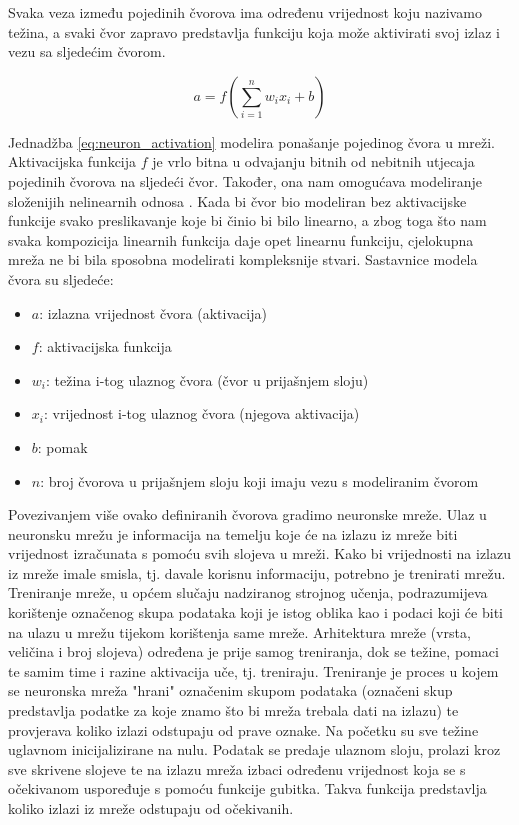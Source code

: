 Svaka veza između pojedinih čvorova ima određenu vrijednost koju nazivamo težina, a svaki čvor
zapravo predstavlja funkciju koja može aktivirati svoj izlaz i vezu sa sljedećim čvorom.

\begin{equation}
  \label{eq:neuron_activation}
  a = f\left(\sum_{i=1}^n w_i x_i + b\right)
\end{equation}

Jednadžba \eqref{eq:neuron_activation} modelira ponašanje pojedinog čvora u mreži. Aktivacijska
funkcija \( f \) je vrlo bitna u odvajanju bitnih od nebitnih utjecaja pojedinih čvorova na sljedeći
čvor. Također, ona nam omogućava modeliranje složenijih nelinearnih odnosa \cite{activation_fcn}.
Kada bi čvor bio modeliran
bez aktivacijske funkcije svako preslikavanje koje bi činio bi bilo linearno, a zbog toga što nam
svaka kompozicija linearnih funkcija daje opet linearnu funkciju, cjelokupna mreža ne bi bila sposobna
modelirati kompleksnije stvari. Sastavnice modela čvora su sljedeće:

\begin{itemize}
  \item \( a \): izlazna vrijednost čvora (aktivacija)
  \item \( f \): aktivacijska funkcija
  \item \( w_i \): težina i-tog ulaznog čvora (čvor u prijašnjem sloju)
  \item \( x_i \): vrijednost i-tog ulaznog čvora (njegova aktivacija)
  \item \( b \): pomak
  \item \( n \): broj čvorova u prijašnjem sloju koji imaju vezu s modeliranim čvorom
\end{itemize}

Povezivanjem više ovako definiranih čvorova gradimo neuronske mreže. Ulaz u neuronsku mrežu 
je informacija na temelju koje će na izlazu iz mreže biti vrijednost izračunata s pomoću svih
slojeva u mreži. Kako bi vrijednosti na izlazu iz mreže imale smisla, tj. davale korisnu
informaciju, potrebno je trenirati mrežu. Treniranje mreže, u općem slučaju nadziranog strojnog
učenja, podrazumijeva korištenje označenog skupa podataka koji je istog oblika kao i podaci
koji će biti na ulazu u mrežu tijekom korištenja same mreže. Arhitektura mreže (vrsta, veličina
i broj slojeva) određena je prije samog treniranja, dok se težine, pomaci te samim time i 
razine aktivacija uče, tj. treniraju. Treniranje je proces u kojem se neuronska mreža "hrani" 
označenim skupom podataka (označeni skup predstavlja podatke za koje znamo što bi mreža trebala
dati na izlazu) te provjerava koliko izlazi odstupaju od prave oznake. Na početku su sve težine
uglavnom inicijalizirane na nulu. Podatak se predaje ulaznom sloju, prolazi kroz sve skrivene
slojeve te na izlazu mreža izbaci određenu vrijednost koja se s očekivanom uspoređuje s pomoću
funkcije gubitka. Takva funkcija predstavlja koliko izlazi iz mreže odstupaju od očekivanih.


